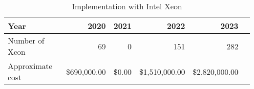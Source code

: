 \tiny \begin{longtable} { |p{}  |r  |r  |r  |r  |r |} 
\caption{Implementation with Intel Xeon \label{tab:Xeon}}\\ 
\hline 
\textbf{Year}&\textbf{2020}&\textbf{2021}&\textbf{2022}&\textbf{2023} \\ \hline
{Number of Xeon}&{69}&{0}&{151}&{282} \\ \hline
{Approximate cost}&{\$690,000.00}&{\$0.00}&{\$1,510,000.00}&{\$2,820,000.00} \\ \hline
\end{longtable} \normalsize
